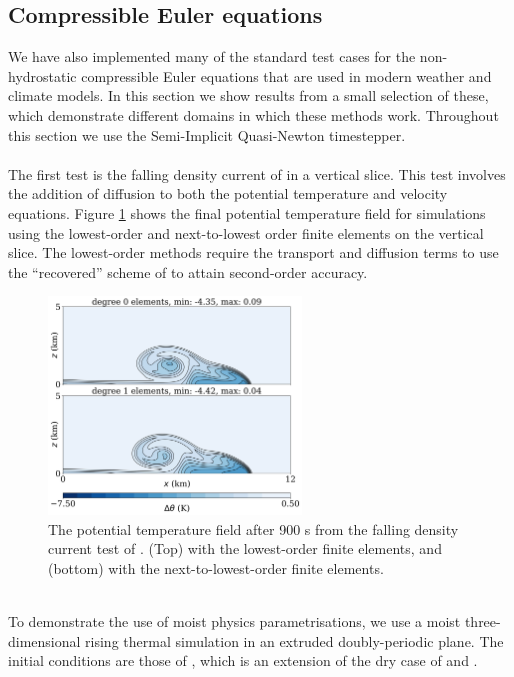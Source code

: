 \documentclass[journal abbreviation, manuscript]{copernicus}
\begin{document}
\subsection{Compressible Euler equations}
We have also implemented many of the standard test cases for the non-hydrostatic compressible Euler equations that are used in modern weather and climate models.
In this section we show results from a small selection of these, which demonstrate different domains in which these methods work.
Throughout this section we use the Semi-Implicit Quasi-Newton timestepper.
 \\
\\
The first test is the falling density current of \citet{straka1993numerical} in a vertical slice. This test involves the addition of diffusion to both the potential temperature and velocity equations.
Figure \ref{fig:straka} shows the final potential temperature field for simulations using the lowest-order and next-to-lowest order finite elements on the vertical slice.
The lowest-order methods require the transport and diffusion terms to use the ``recovered'' scheme of \citet{bendall2019recovered} to attain second-order accuracy. 
\\
\begin{figure}[htp!]
\centering
\includegraphics[width=0.6\textwidth]{figures/straka.png}
\caption{The potential temperature field after 900 s from the falling density current test of \citet{straka1993numerical}. (Top) with the lowest-order finite elements, and (bottom) with the next-to-lowest-order finite elements.
}
\label{fig:straka}
\end{figure}
\\
To demonstrate the use of moist physics parametrisations, we use a moist three-dimensional rising thermal simulation in an extruded doubly-periodic plane.
The initial conditions are those of \citet{bendall2020compatible}, which is an extension of the dry case of \citet{kelly2012continuous} and \citet{melvin2019mixed}.
\end{document}
